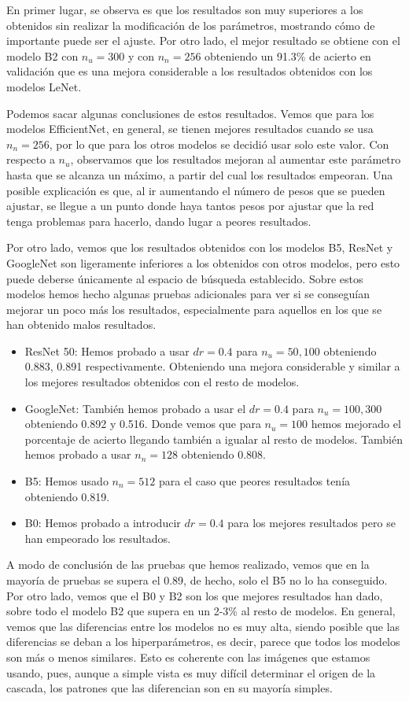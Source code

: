 \documentclass[a4paper,12pt,oneside,titlepage]{book}
\begin{document}
En primer lugar, se observa es que los resultados son muy superiores a los obtenidos sin realizar la modificación de los parámetros, mostrando cómo de importante puede ser el ajuste. Por otro lado, el mejor resultado se obtiene con el modelo B2 con $n_u = 300$ y con $n_n = 256$ obteniendo un 91.3\% de acierto en validación que es una mejora considerable a los resultados obtenidos con los modelos LeNet.
 
Podemos sacar algunas conclusiones de estos resultados. Vemos que para los modelos EfficientNet, en general, se tienen mejores resultados cuando se usa $n_n = 256$, por lo que para los otros modelos se decidió usar solo este valor. Con respecto a $n_u$, observamos que los resultados mejoran al aumentar este parámetro hasta que se alcanza un máximo, a partir del cual los resultados empeoran. Una posible explicación es que, al ir aumentando el número de pesos que se pueden ajustar, se llegue a un punto donde haya tantos pesos por ajustar que la red tenga problemas para hacerlo, dando lugar a peores resultados.
 
Por otro lado, vemos que los resultados obtenidos con los modelos B5, ResNet y GoogleNet son ligeramente inferiores a los obtenidos con otros modelos, pero esto puede deberse únicamente al espacio de búsqueda establecido. Sobre estos modelos hemos hecho algunas pruebas adicionales para ver si se conseguían mejorar un poco más los resultados, especialmente para aquellos en los que se han obtenido malos resultados.

\begin{itemize}
  \item ResNet 50: Hemos probado a usar $dr = 0.4$ para $n_u = 50, 100$ obteniendo 0.883, 0.891 respectivamente. Obteniendo una mejora considerable y similar a los mejores resultados obtenidos con el resto de modelos.
  \item GoogleNet: También hemos probado a usar el $dr = 0.4$ para $n_u = 100, 300$ obteniendo 0.892 y 0.516. Donde vemos que para $n_u = 100$ hemos mejorado el porcentaje de acierto llegando también a igualar al resto de modelos. También hemos probado a usar $n_n = 128$ obteniendo 0.808.
  \item B5: Hemos usado $n_n = 512$ para el caso que peores resultados tenía obteniendo 0.819.
  \item B0: Hemos probado a introducir $dr = 0.4$ para los mejores resultados pero se han empeorado los resultados.
\end{itemize}
 
A modo de conclusión de las pruebas que hemos realizado, vemos que en la mayoría de pruebas se supera el 0.89, de hecho, solo el B5 no lo ha conseguido. Por otro lado, vemos que el B0 y B2 son los que mejores resultados han dado, sobre todo el modelo B2 que supera en un 2-3\% al resto de modelos. En general, vemos que las diferencias entre los modelos no es muy alta, siendo posible que las diferencias se deban a los hiperparámetros, es decir, parece que todos los modelos son más o menos similares. Esto es coherente con las imágenes que estamos usando, pues, aunque a simple vista es muy difícil determinar el origen de la cascada, los patrones que las diferencian son en su mayoría simples.
\end{document}
